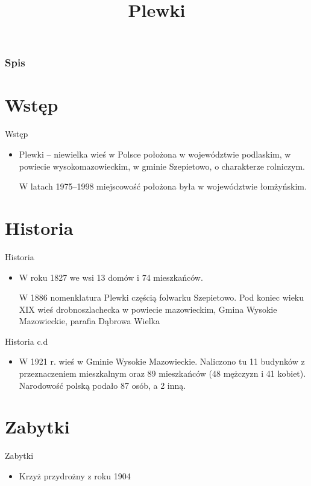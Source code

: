 \documentclass{beamer}
\title{Plewki}
\author{}
\begin{document}
\frame{\titlepage}

\begin {frame}
\frametitle{Spis}
\tableofcontents
\end {frame}


\section{Wstęp}
\begin{frame}{Wstęp}
\begin{itemize}
\item Plewki – niewielka wieś w Polsce położona w województwie podlaskim, w powiecie wysokomazowieckim, w gminie Szepietowo, o charakterze rolniczym.

W latach 1975–1998 miejscowość położona była w województwie łomżyńskim.

\end{itemize}
\end{frame}


\section{Historia}
\begin{frame}{Historia}
\begin {itemize}
\item W roku 1827 we wsi 13 domów i 74 mieszkańców.

W 1886 nomenklatura Plewki częścią folwarku Szepietowo. Pod koniec wieku XIX wieś drobnoszlachecka w powiecie mazowieckim, Gmina Wysokie Mazowieckie, parafia Dąbrowa Wielka


\end {itemize}
\end{frame}
\begin{frame}{Historia c.d}
\begin{itemize}
\item W 1921 r. wieś w Gminie Wysokie Mazowieckie. Naliczono tu 11 budynków z przeznaczeniem mieszkalnym oraz 89 mieszkańców (48 mężczyzn i 41 kobiet). Narodowość polską podało 87 osób, a 2 inną.
\end{itemize}
\end{frame}
\section {Zabytki}
\begin {frame}{Zabytki}
\begin{itemize}
\item Krzyż przydrożny z roku 1904 \cite{deni}
\end{itemize}
\end{frame}
\end{document}
